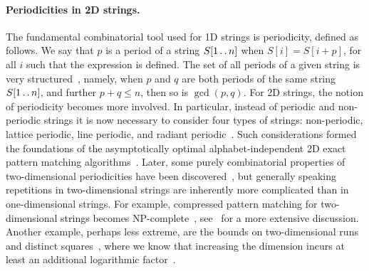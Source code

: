 \documentclass[twoside,leqno]{article}
\def\dd{\mathinner{.\,.}}
\begin{document}
\paragraph{Periodicities in 2D strings.} The fundamental combinatorial tool used for 1D strings is periodicity,
defined as follows. We say that $p$ is a period of a string $S[1 \dd n]$ when $S[i]=S[i+p]$, for all $i$ such that the expression is defined.
The set of all periods of a given string is very structured~\cite{Fine1965}, namely, when $p$ and $q$ are both periods
of the same string $S[1 \dd n]$, and further $p+q\leq n$, then so is $\gcd(p,q)$.
For 2D strings, the notion of periodicity becomes more involved. In particular, instead of periodic
and non-periodic strings it is now necessary to consider four types of strings: non-periodic, lattice periodic, line periodic, and
radiant periodic~\cite{Amir1998}. Such considerations formed the foundations of the asymptotically optimal alphabet-independent
2D exact pattern matching algorithms~\cite{Amir1994,Galil1996}.
Later, some purely combinatorial properties of two-dimensional periodicities have been discovered~\cite{Mignosi2003,Gamard2017},
but generally speaking repetitions in two-dimensional strings are inherently more complicated than in one-dimensional strings.
For example, compressed pattern matching for two-dimensional strings becomes NP-complete~\cite{Berman2002}, see~\cite{Rytter2000}
for a more extensive discussion.
Another example, perhaps less extreme, are the bounds on two-dimensional runs~\cite{Amir2020} and
distinct squares~\cite{Charalampopoulos2020}, where we know that increasing the dimension incurs at least an additional
logarithmic factor~\cite{Charalampopoulos2020}.
\end{document}
